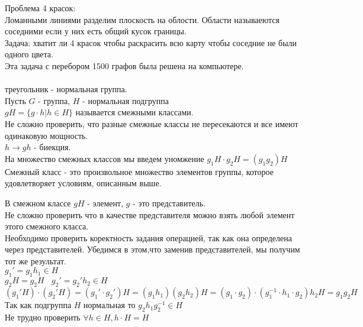 Проблема 4 красок:\\
Ломанными линиями разделим плоскость на облости. Области
называеются соседними если у них есть общий кусок границы.\\
Задача: хватит ли 4 красок чтобы раскрасить всю карту чтобы соседние не были
одного цвета.\\
Эта задача с перебором 1500 графов была решена на компьютере.\\

\\
треугольник - нормальная группа.\\
Пусть $G$ - группа, $H$ - нормальная подгруппа\\
$gH = \{g\cdot h | h \in H\}$ называется смежными классами.\\
Не сложно проверить, что разные смежные классы не пересекаются
и все имеют одинаковую мощность.\\
$h \to gh$ - биекция.\\
На множество смежных классов мы введем уномжение $g_1H\cdot g_2H = (g_1g_2)H$\\

Смежный класс - это произвольное множество элементов группы, которое
удовлетворяет условиям, описанным выше.\\
\begin{defin}
	В смежном классе $gH$ - элемент, $g$ - это представитель.\\
           Не сложно проверить что в качестве представителя можно взять 
           любой элемент этого смежного класса.\\
	Необходимо проверить коректность задания операцией, так как она определена через
	представителей. Убедимся в этом,что заменив представителей, мы получим тот же
	результат.\\
	$g_1' = g_1 h_1 \in H$\\
	$g_2 H = g_2 H ~~~~ g_2' = g_2' h_2 \in H$\\
	$
		(g_1' H)\cdot(g_2' H) = (g_1'\cdot g_2') H = (g_1 h_1)(g_2 h_2)H =
		(g_1 \cdot g_2)\cdot(g_{1}^{-1} \cdot h_1 \cdot g_2)h_2 H = g_1 g_2H
	$\\
	Так как подгруппа $H$ нормальная то $g_2 h_1 g_{2}^{-1} \in H$\\
	Не трудно проверить $\forall h\in H,  h\cdot H = H$\\
\end{defin}


